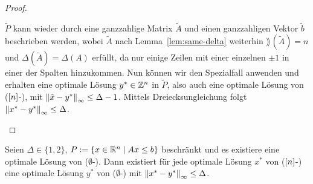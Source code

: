\begin{proof}
\begin{description}
		$\tilde{P}$ kann wieder durch eine ganzzahlige Matrix $\tilde{A}$  und einen ganzzahligen Vektor $\tilde{b}$ beschrieben werden, wobei $\tilde{A}$ nach Lemma~\ref{lem:same-delta} weiterhin $\rang(\tilde{A})=n$ und $\Delta(\tilde{A})=\Delta(A)$ erfüllt, da nur einige Zeilen mit einer einzelnen $\pm 1$ in einer der Spalten hinzukommen.
		Nun können wir den Spezialfall anwenden und erhalten eine optimale Lösung $y^*\in\mathbb{Z}^n$ in $\tilde{P}$, also auch eine optimale Lösung von ($[n]$-\MIPI), mit $\left\lVert\tilde{x} -y^*\right\rVert_\infty\leq \Delta -1$.
		Mittels Dreiecksungleichung folgt $\left\lVert x^* - y^*\right\rVert_\infty\leq \Delta$.
	\end{description}
\end{proof}

\begin{lemma}\label{lem:i-e-j-n}
	Seien $\Delta\in\{1,2\}$, $P:=\{x\in\mathbb{R}^n \mid Ax\leq b \}$ beschränkt und es existiere eine optimale Lösung von ($\emptyset$-\MIPI).
	Dann existiert für jede optimale Lösung $x^*$ von ($[n]$-\MIPI) eine optimale Lösung $y^*$ von ($\emptyset$-\MIPI) mit $\left\lVert x^*-y^*\right\rVert_\infty\leq \Delta$.
\end{lemma}
